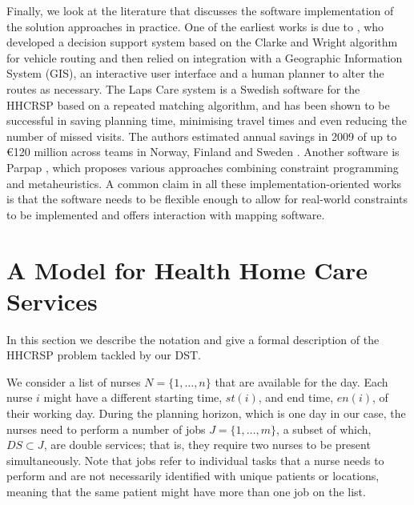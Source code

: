 \documentclass[a4paper,11pt,authoryear]{elsarticle}
\begin{document}
Finally, we look at the literature that discusses the software implementation of the solution approaches in practice. One of the earliest works is due to \cite{begur1997}, who developed a decision support system based on the Clarke and Wright algorithm \citep{clarke1964} for vehicle routing and then relied on integration with a Geographic Information System (GIS), an interactive user interface and a human planner to alter the routes as necessary. The Laps Care system \citep{eveborn2006, eveborn2009} is a Swedish software for the HHCRSP based on a repeated matching algorithm, and has been shown to be successful in saving planning time, minimising travel times and even reducing the number of missed visits. The authors estimated annual savings in 2009 of up to \euro 120 million across teams in Norway, Finland and Sweden \citep{eveborn2009}. Another software is Parpap \citep{bertels2006}, which proposes various approaches combining constraint programming and metaheuristics. A common claim in all these implementation-oriented works is that the software needs to be flexible enough to allow for real-world constraints to be implemented and offers interaction with mapping software.

\section{A Model for Health Home Care Services}
\label{sec:model}
\noindent In this section we describe the notation and give a formal description of the HHCRSP problem tackled by our DST.

We consider a list of nurses $N = \{1,\dots,n\}$ that are available for the day. Each nurse $i$ might have a different starting time, $st(i)$, and end time, $en(i)$, of their working day. During the planning horizon, which is one day in our case, the nurses need to perform a number of jobs $J = \{1,\dots,m\}$, a subset of which, $DS \subset J$, are double services; that is, they require two nurses to be present simultaneously. Note that jobs refer to individual tasks that a nurse needs to perform and are not necessarily identified with unique patients or locations, meaning that the same patient might have more than one job on the list.
\end{document}
